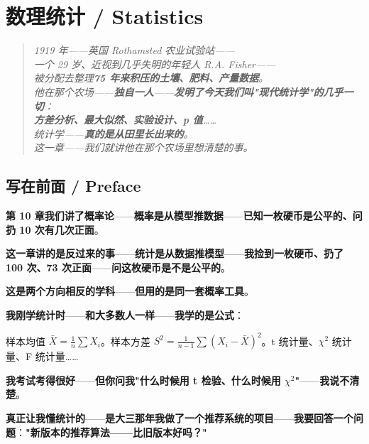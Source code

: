 
\chapter{数理统计 / Statistics}
\label{ch:stats}

\begin{quote}\itshape
1919 年——英国 Rothamsted 农业试验站——\\
一个 29 岁、近视到几乎失明的年轻人 R.A. Fisher——\\
被分配去整理\textbf{75 年来积压的土壤、肥料、产量数据}。\\
他在那个农场——\textbf{独自一人}——\textbf{发明了今天我们叫"现代统计学"的几乎一切}：\\
\textbf{方差分析、最大似然、实验设计、p 值}……\\
统计学——\textbf{真的是从田里长出来的}。\\
这一章——我们就讲他在那个农场里想清楚的事。
\end{quote}

\section{写在前面 / Preface}

\textbf{第 10 章我们讲了概率论}——\textbf{概率是从模型推数据}——\textbf{已知一枚硬币是公平的、问扔 10 次有几次正面}。

\textbf{这一章讲的是反过来的事}——\textbf{统计是从数据推模型}——\textbf{我捡到一枚硬币、扔了 100 次、73 次正面}——\textbf{问这枚硬币是不是公平的}。

\textbf{这是两个方向相反的学科}——\textbf{但用的是同一套概率工具}。

\textbf{我刚学统计时}——\textbf{和大多数人一样}——\textbf{我学的是公式}：

样本均值 $\bar{X} = \frac{1}{n}\sum X_i$。样本方差 $S^2 = \frac{1}{n-1}\sum(X_i - \bar{X})^2$。t 统计量、$\chi^2$ 统计量、F 统计量……

\textbf{我考试考得很好}——\textbf{但你问我"什么时候用 t 检验、什么时候用 $\chi^2$"}——\textbf{我说不清楚}。

\textbf{真正让我懂统计的}——\textbf{是大三那年我做了一个推荐系统的项目}——\textbf{我要回答一个问题}：\textbf{"新版本的推荐算法——比旧版本好吗？"}

